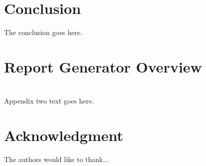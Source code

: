 \documentclass[journal]{IEEEtran}
\begin{document}
\section{Conclusion}
The conclusion goes here.



\appendices
\section{Report Generator Overview}


\section{}
Appendix two text goes here.


\section*{Acknowledgment}
The authors would like to thank...
\ifCLASSOPTIONcaptionsoff
  \newpage
\fi


{}

\end{document}
